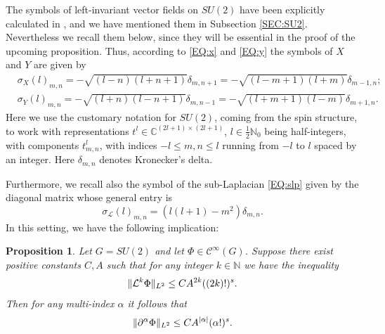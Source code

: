 \documentclass[12pt,oneside,a4paper]{book}
\numberwithin{equation}{section}     %
\theoremstyle{plain}
\newtheorem{proposition}[theorem]{Proposition}
\theoremstyle{definition}
\newcommand{\C}{{\mathbb C}}
\newcommand{\N}{{\mathbb N}}
\newcommand{\slp}{{\mathcal L}}
\begin{document}
The symbols of left-invariant vector fields on $SU(2)$ have been explicitly calculated in 
\cite[Theorem 12.2.1]{RT2009}, and we have mentioned them in Subsection \ref{SEC:SU2}. Nevertheless we recall them below, since they will be essential in the proof of the upcoming proposition. Thus, according to \eqref{EQ:x} and \eqref{EQ:y} the symbols of $X$ and $Y$ are given by
\begin{align}\label{x}
&\sigma_X(l)_{m,n}=-\sqrt{(l-n)(l+n+1)}\delta_{m,n+1}=-\sqrt{(l-m+1)(l+m)}\delta_{m-1,n};\\\label{y}
&\sigma_Y(l)_{m,n}=-\sqrt{(l+n)(l-n+1)}\delta_{m,n-1}=-\sqrt{(l+m+1)(l-m)}\delta_{m+1,n}.
\end{align}
Here we use the customary notation for $SU(2)$, coming from the spin structure, to work with representations $t^l\in\C^{(2l+1)\times (2l+1)}$, $l\in \frac12\N_0$ being half-integers, with components $t^l_{m,n}$, with indices $-l\leq m,n\leq l$ running from $-l$ to $l$ spaced by an integer. Here $\delta_{m,n}$ denotes Kronecker's delta.

Furthermore, we recall also the symbol of the sub-Laplacian \eqref{EQ:slp} given by the diagonal matrix whose general entry is
\begin{equation}\label{symbolslp}
\sigma_\slp(l)_{m,n}=(l(l+1)-m^2)\delta_{m,n}.
\end{equation}
In this setting, we have the following implication:

\begin{proposition}\label{PROP:SU2}
	Let $G=SU(2)$ and let $\Phi\in\mathcal{C}^{\infty}(G)$. Suppose there exist positive constants $C,A$ such that for any integer $k\in\N$ we have the inequality
	\begin{equation}\notag
	\|\slp^k\Phi\|_{L^2}\leq CA^{2k}((2k)!)^s.
	\end{equation} 
	Then for any multi-index $\alpha$ it follows that
	\begin{equation}\notag
	\|\partial^\alpha\Phi\|_{L^2}\leq CA^{|\alpha|}(\alpha!)^s.
	\end{equation}
\end{proposition}
\end{document}
